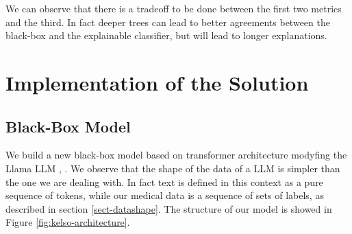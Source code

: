 \documentclass[]{marticle}
\begin{document}
We can observe that there is a tradeoff to be done between the first two metrics and the third. In
fact deeper trees can lead to better agreements between the black-box and the explainable
classifier, but will lead to longer explanations.


\section{Implementation of the Solution}

\subsection{Black-Box Model} \label{sect-kelso}

We build a new black-box model based on transformer architecture modyfing the Llama LLM
\cite{llama}, \cite{llama-2}. We observe that the shape of the data of a LLM is simpler than the one
we are dealing with. In fact text is defined in this context as a pure sequence of tokens, while our
medical data is a sequence of sets of labels, as described in section \ref{sect-datashape}. The
structure of our model is showed in Figure \ref{fig:kelso-architecture}.
\end{document}
